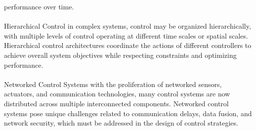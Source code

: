 \documentclass[12pt]{report}
\begin{document}
performance over time.\\
\\
Hierarchical Control in complex systems, control may be organized hierarchically, with
multiple levels of control operating at different time scales or spatial scales. Hierarchical
control architectures coordinate the actions of different controllers to achieve overall
system objectives while respecting constraints and optimizing performance.\\
\\
Networked Control Systems with the proliferation of networked sensors, actuators, and
communication technologies, many control systems are now distributed across multiple
interconnected components. Networked control systems pose unique challenges related to
communication delays, data fusion, and network security, which must be addressed in the
design of control strategies.
\end{document}
